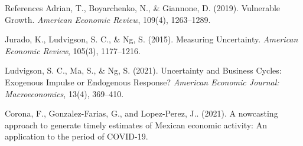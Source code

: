 \documentclass[handout,aspectratio=169,11pt,xcolor={dvipsnames},hyperref={pdftex,pdfpagemode=UseNone,hidelinks,pdfdisplaydoctitle=true},usepdftitle=false]{beamer}
\begin{document}
\begin{frame}{References}
Adrian, T., Boyarchenko, N., \& Giannone, D. (2019).
Vulnerable Growth.
\textit{American Economic Review}, 109(4), 1263--1289.

Jurado, K., Ludvigson, S. C., \& Ng, S. (2015).
Measuring Uncertainty.
\textit{American Economic Review}, 105(3), 1177--1216.

Ludvigson, S. C., Ma, S., \& Ng, S. (2021).
Uncertainty and Business Cycles: Exogenous Impulse or Endogenous Response?
\textit{American Economic Journal: Macroeconomics}, 13(4), 369--410.

Corona, F., Gonzalez-Farias, G., and Lopez-Perez, J.. (2021). A nowcasting approach to generate timely estimates of Mexican economic activity: An application to the period of COVID-19.  

\end{frame}
\end{document}
